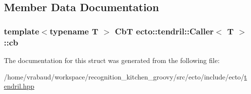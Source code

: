 \subsection{\-Member \-Data \-Documentation}
\hypertarget{structecto_1_1tendril_1_1Caller_afecdbc09ca504c16292a6365ab1cd950}{
\subsubsection[{cb}]{\setlength{\rightskip}{0pt plus 5cm}template$<$typename T $>$ {\bf \-Cb\-T} {\bf ecto\-::tendril\-::\-Caller}$<$ \-T $>$\-::{\bf cb}}}\label{structecto_1_1tendril_1_1Caller_afecdbc09ca504c16292a6365ab1cd950}


\-The documentation for this struct was generated from the following file\-:\begin{DoxyCompactItemize}
\item 
/home/vrabaud/workspace/recognition\-\_\-kitchen\-\_\-groovy/src/ecto/include/ecto/\hyperlink{tendril_8hpp}{tendril.\-hpp}\end{DoxyCompactItemize}
